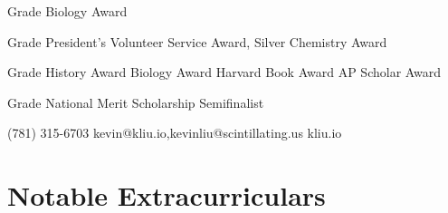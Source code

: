 \documentclass[paper=letter]{tccv}
\begin{document}
\begin{yearlist}

\item{ Grade}
     {Biology Award}
     {}

\item{ Grade}
     {President's Volunteer Service Award, Silver\newline
     Chemistry Award}
     {}

\item{ Grade}
    {History Award\newline
     Biology Award\newline
     Harvard Book Award\newline
     AP Scholar Award}
     {}

\item{ Grade}
    {National Merit Scholarship Semifinalist}
     {}

\end{yearlist}

    {(781) 315-6703}
    {kevin@kliu.io,kevinliu@scintillating.us}
    {kliu.io}

\section{Notable Extracurriculars}
\end{document}
